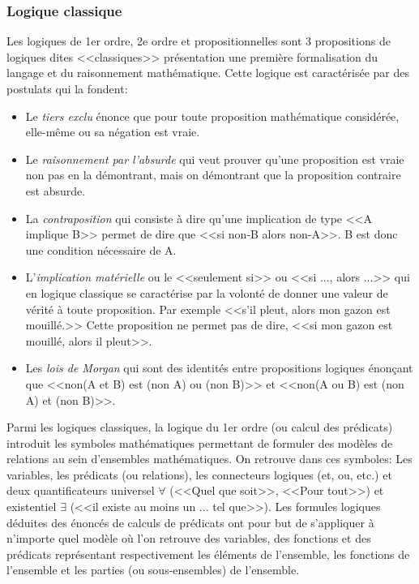 \subsubsection{Logique classique}

Les logiques de 1er ordre, 2e ordre et propositionnelles sont 3 propositions de logiques dites <<classiques>> présentation une première formalisation du langage et du raisonnement mathématique. Cette logique est caractérisée par des postulats qui la fondent:

\begin{itemize}
  \item Le \textit{tiers exclu} énonce que pour toute proposition mathématique considérée, elle-même ou sa négation est vraie.
  \item Le \textit{raisonnement par l'absurde} qui veut prouver qu'une proposition est vraie non pas en la démontrant, mais on démontrant que la proposition contraire est absurde.
  \item La \textit{contraposition} qui consiste à dire qu'une implication de type <<A implique B>> permet de dire que <<si non-B alors non-A>>. B est donc une condition nécessaire de A.
  \item L'\textit{implication matérielle} ou le <<seulement si>> ou <<si ..., alors ...>> qui en logique classique se caractérise par la volonté de donner une valeur de vérité à toute proposition. Par exemple <<s'il pleut, alors mon gazon est mouillé.>> Cette proposition ne permet pas de dire, <<si mon gazon est mouillé, alors il pleut>>.
  \item Les \textit{lois de Morgan} qui sont des identités entre propositions logiques énonçant que <<non(A et B) est (non A) ou (non B)>> et <<non(A ou B) est (non A) et (non B)>>.
\end{itemize}

Parmi les logiques classiques, la logique du 1er ordre (ou calcul des prédicats) introduit les symboles mathématiques permettant de formuler des modèles de relations au sein d'ensembles mathématiques. On retrouve dans ces symboles: Les variables, les prédicats (ou relations), les connecteurs logiques (et, ou, etc.) et deux quantificateurs universel $\forall$ (<<Quel que soit>>, <<Pour tout>>) et existentiel $\exists$ (<<il existe au moins un ... tel que>>). Les formules logiques déduites des énoncés de calculs de prédicats ont pour but de s'appliquer à n'importe quel modèle où l'on retrouve des variables, des fonctions et des prédicats représentant respectivement les éléments de l'ensemble, les fonctions de l'ensemble et les parties (ou sous-ensembles) de l'ensemble.


